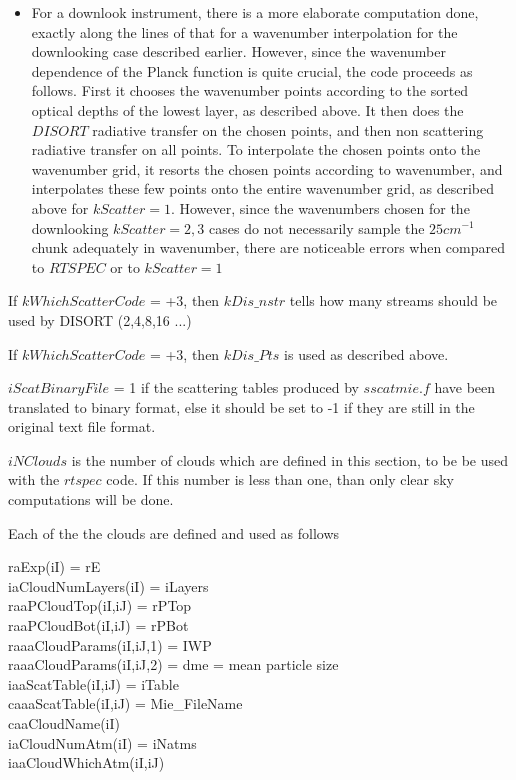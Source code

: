 \documentclass[12pt]{article}
\newcommand{\ttab}{\indent\indent}
\begin{document}
{{\begin{itemize}
\item For a downlook instrument, there is a more 
elaborate computation done, exactly along the lines of that for a wavenumber
interpolation for the downlooking case described earlier. However, since the
wavenumber dependence of the Planck function is quite crucial, the code 
proceeds as follows. First it chooses the wavenumber points according to the
sorted optical depths of the lowest layer, as described above. It then does the
$DISORT$ radiative transfer on the chosen points, and then non scattering
radiative transfer on all points. To interpolate the chosen points onto the
wavenumber grid, it resorts the chosen points according to wavenumber, and 
interpolates these few points onto the entire wavenumber grid, as described
above for $kScatter = 1$. However, since the wavenumbers chosen for the 
downlooking $kScatter = 2,3$ cases do not necessarily sample the 
$25 cm^{-1}$ chunk adequately in wavenumber, there are noticeable errors when 
compared to $RTSPEC$ or to $kScatter = 1$

\end{itemize}
\vspace{0.25in} 

\noindent If $kWhichScatterCode$ = +3, then  $kDis\_nstr$ tells how many 
streams should be used by DISORT (2,4,8,16 ...)
\vspace{0.25in} 

\noindent If $kWhichScatterCode$ = +3, then  $kDis\_Pts$ is used as 
described above.
\vspace{0.25in} 

\noindent $iScatBinaryFile$ = 1 if the scattering tables produced by 
$sscatmie.f$ have been translated to binary format, else it should be set 
to -1 if they are still in the original text file format.
\vspace{0.25in} 

\noindent $iNClouds$ is the number of clouds which are defined in this 
section, to be be used with the $rtspec$ code. If this number is less than 
one, than only clear sky computations will be done.
\vspace{0.25in} 

\noindent Each of the the clouds are defined and used as follows \\

\smallskip\noindent

\ttab raExp(iI) = rE \\
\ttab iaCloudNumLayers(iI) = iLayers\\
\ttab raaPCloudTop(iI,iJ) = rPTop \\
\ttab raaPCloudBot(iI,iJ) = rPBot \\
\ttab raaaCloudParams(iI,iJ,1) = IWP\\
\ttab raaaCloudParams(iI,iJ,2) = dme = mean particle size\\
\ttab iaaScatTable(iI,iJ) = iTable\\
\ttab caaaScatTable(iI,iJ) = Mie\_FileName\\
\ttab caaCloudName(iI) \ \\
\ttab iaCloudNumAtm(iI) = iNatms\\
\ttab \indent  iaaCloudWhichAtm(iI,iJ)\\

}}
\end{document}
